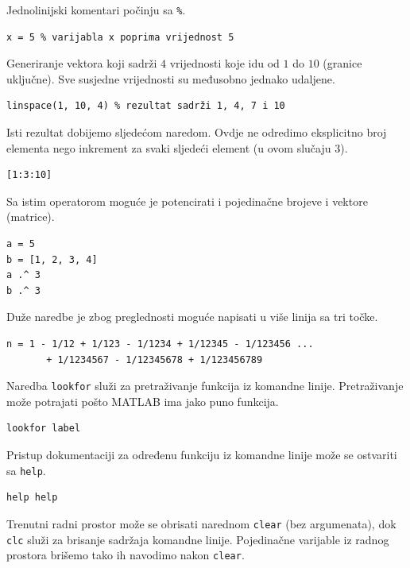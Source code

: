 \documentclass[a4paper, 10pt]{article}
\begin{document}
Jednolinijski komentari počinju sa \texttt{\%}.

\begin{lstlisting}
x = 5 % varijabla x poprima vrijednost 5
\end{lstlisting}

Generiranje vektora koji sadrži $4$ vrijednosti koje idu od $1$ do $10$ (granice uključne). Sve susjedne vrijednosti su međusobno jednako udaljene.

\begin{lstlisting}
linspace(1, 10, 4) % rezultat sadrži 1, 4, 7 i 10
\end{lstlisting}

Isti rezultat dobijemo sljedećom naredom. Ovdje ne odredimo eksplicitno broj elementa nego inkrement za svaki sljedeći element (u ovom slučaju $3$).

\begin{lstlisting}
[1:3:10]
\end{lstlisting}

Sa istim operatorom moguće je potencirati i pojedinačne brojeve i vektore (matrice).

\begin{lstlisting}
a = 5
b = [1, 2, 3, 4]
a .^ 3
b .^ 3
\end{lstlisting}

Duže naredbe je zbog preglednosti moguće napisati u više linija sa tri točke.

\begin{lstlisting}
n = 1 - 1/12 + 1/123 - 1/1234 + 1/12345 - 1/123456 ...
       + 1/1234567 - 1/12345678 + 1/123456789
\end{lstlisting}

Naredba \texttt{lookfor} služi za pretraživanje funkcija iz komandne linije. Pretraživanje može potrajati pošto MATLAB ima jako puno funkcija.

\begin{lstlisting}
lookfor label
\end{lstlisting}

Pristup dokumentaciji za određenu funkciju iz komandne linije može se ostvariti sa \texttt{help}.

\begin{lstlisting}
help help
\end{lstlisting}

Trenutni radni prostor može se obrisati narednom \texttt{clear} (bez argumenata), dok \texttt{clc} služi za brisanje sadržaja komandne linije. Pojedinačne varijable iz radnog prostora brišemo tako ih navodimo nakon \texttt{clear}.
\end{document}
